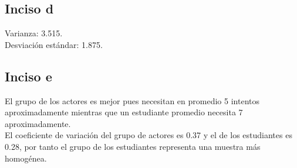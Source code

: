 \documentclass[a4paper,12pt]{article}
\begin{document}
\subsection*{Inciso d}
Varianza: 3.515.\\
Desviación estándar: 1.875.

\subsection*{Inciso e}
El grupo de los actores es mejor pues necesitan en promedio 5 intentos aproximadamente mientras que un estudiante promedio necesita 7 aproximadamente.\\
El coeficiente de variación del grupo de actores es 0.37 y el de los estudiantes es 0.28, por tanto el grupo de los estudiantes representa una muestra más homogénea.
\end{document}
